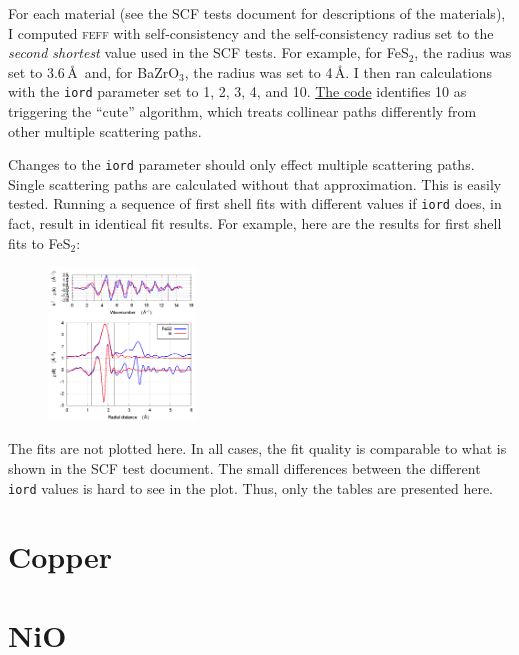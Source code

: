 \documentclass{article}
\begin{document}
For each material (see the SCF tests document for descriptions of the
materials), I computed \textsc{feff} with self-consistency and the
self-consistency radius set to the \textit{second shortest} value used
in the SCF tests.  For example, for FeS$_2$, the radius was set to
3.6\,\AA\ and, for BaZrO$_3$, the radius was set to 4\,\AA.  I then
ran calculations with the \texttt{iord} parameter set to 1, 2, 3, 4,
and 10.
\href{https://github.com/xraypy/feff85exafs/blob/master/src/GENFMT/setlam.f#L60}%
{The code} identifies 10 as triggering the ``cute'' algorithm, which
treats collinear paths differently from other multiple scattering
paths.

Changes to the \texttt{iord} parameter should only effect multiple
scattering paths.  Single scattering paths are calculated without that
approximation.  This is easily tested.  Running a sequence of first
shell fits with different values if \texttt{iord} does, in fact,
result in identical fit results.  For example, here are the results
for first shell fits to FeS$_2$:

\begin{figure}
  \vspace{-40pt}
  \includegraphics[width=0.35\textwidth]{FeS2/iorder/fit_iorder_02_1st.png}
\end{figure}
\small

\normalsize

The fits are not plotted here.  In all cases, the fit quality is
comparable to what is shown in the SCF test document.  The small
differences between the different \texttt{iord} values is hard to see
in the plot.  Thus, only the tables are presented here.

\section{Copper}

\small

\normalsize

\section{NiO}
\end{document}
